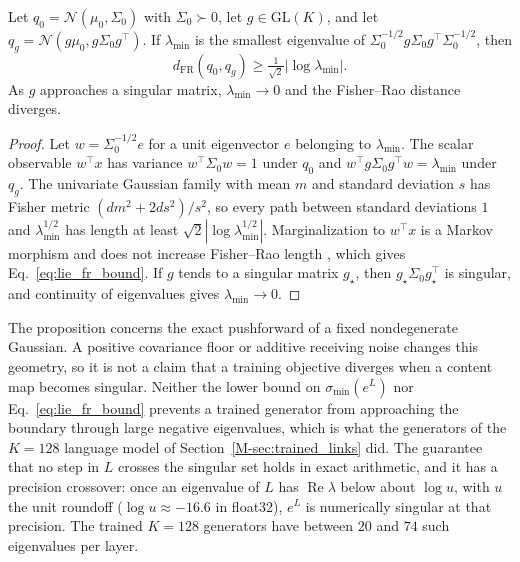 \documentclass[twoside,11pt]{article}
\begin{document}
\begin{proposition}
\label{prop:lie_boundary}
Let $q_0=\mathcal N(\mu_0,\Sigma_0)$ with $\Sigma_0\succ0$, let $g\in\mathrm{GL}(K)$, and let $q_g=\mathcal N(g\mu_0,g\Sigma_0g^\top)$. If $\lambda_{\min}$ is the smallest eigenvalue of $\Sigma_0^{-1/2}g\Sigma_0g^\top\Sigma_0^{-1/2}$, then
\begin{equation}
d_{\mathrm{FR}}(q_0,q_g)\ge\tfrac{1}{\sqrt2}\bigl|\log\lambda_{\min}\bigr|.
\label{eq:lie_fr_bound}
\end{equation}
As $g$ approaches a singular matrix, $\lambda_{\min}\to0$ and the Fisher--Rao distance diverges.
\end{proposition}
\begin{proof}
Let $w=\Sigma_0^{-1/2}e$ for a unit eigenvector $e$ belonging to $\lambda_{\min}$. The scalar observable $w^\top x$ has variance $w^\top\Sigma_0w=1$ under $q_0$ and $w^\top g\Sigma_0g^\top w=\lambda_{\min}$ under $q_g$. The univariate Gaussian family with mean $m$ and standard deviation $s$ has Fisher metric $(dm^2+2ds^2)/s^2$, so every path between standard deviations $1$ and $\lambda_{\min}^{1/2}$ has length at least $\sqrt2|\log\lambda_{\min}^{1/2}|$. Marginalization to $w^\top x$ is a Markov morphism and does not increase Fisher--Rao length \citep[Sec.~2.1]{AmariNagaoka2000}, which gives Eq.~\eqref{eq:lie_fr_bound}. If $g$ tends to a singular matrix $g_\star$, then $g_\star\Sigma_0g_\star^\top$ is singular, and continuity of eigenvalues gives $\lambda_{\min}\to0$.
\end{proof}

The proposition concerns the exact pushforward of a fixed nondegenerate Gaussian. A positive covariance floor or additive receiving noise changes this geometry, so it is not a claim that a training objective diverges when a content map becomes singular. Neither the lower bound on $\sigma_{\min}(e^{L})$ nor Eq.~\eqref{eq:lie_fr_bound} prevents a trained generator from approaching the boundary through large negative eigenvalues, which is what the generators of the $K=128$ language model of Section~\ref{M-sec:trained_links} did. The guarantee that no step in $L$ crosses the singular set holds in exact arithmetic, and it has a precision crossover: once an eigenvalue of $L$ has $\operatorname{Re}\lambda$ below about $\log u$, with $u$ the unit roundoff ($\log u\approx-16.6$ in float32), $e^{L}$ is numerically singular at that precision. The trained $K=128$ generators have between $20$ and $74$ such eigenvalues per layer.
\end{document}
